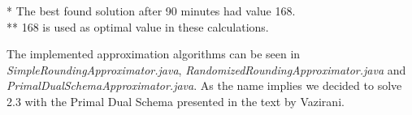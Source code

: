 * The best found solution after 90 minutes had value 168.\\
** 168 is used as optimal value in these calculations.


\noindent
The implemented approximation algorithms can be seen in \textit{SimpleRoundingApproximator.java}, \textit{RandomizedRoundingApproximator.java} and \textit{PrimalDualSchemaApproximator.java}. As the name implies we decided to solve 2.3 with the Primal Dual Schema presented in the text by Vazirani.
